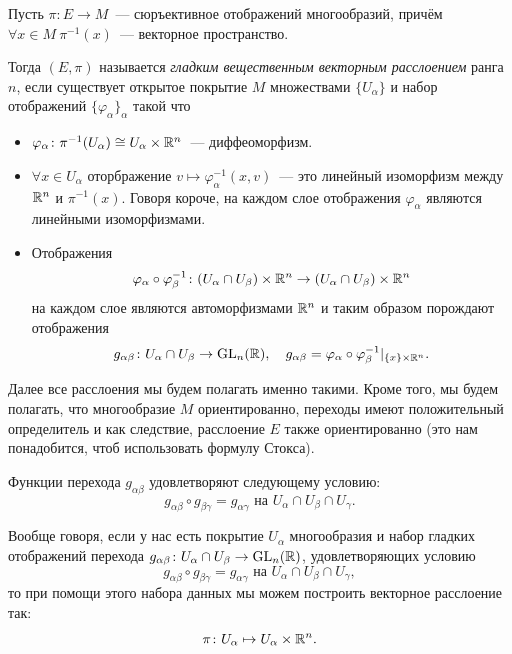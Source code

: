  	 \begin{definition} 
 	 	Пусть $\pi\colon E \to M$~--- сюръективное отображений многообразий, причём $\forall x \in M \ \pi^{-1}(x)$~--- векторное пространство. 

 	 	Тогда $(E, \pi)$ называется \emph{гладким вещественным векторным расслоением} ранга $n$, если существует открытое покрытие $M$ множествами $\{ U_{\alpha} \}$  и набор отображений $\{ \varphi_{\alpha} \}_{\alpha} $ такой что 
 	 	\begin{itemize}
 	 		\item $\varphi_{\alpha}\colon \pi^{-1}(U_{\alpha}) \cong U_{\alpha} \times \mathbb{R}^n$~--- диффеоморфизм. 
 	 		\item $\forall x \in U_{\alpha}$ оторбражение $v \mapsto \varphi_{\alpha}^{-1}(x, v)$~--- это линейный изоморфизм между $\mathbb{R}^n$ и  $\pi^{-1}(x)$. Говоря короче, на каждом слое отображения $\varphi_{\alpha}$ являются линейными изоморфизмами. 

 	 		\item Отображения 
 	 		\[
 	 			\varphi_{\alpha} \circ \varphi_{\beta}^{-1}\colon (U_{\alpha} \cap U_{\beta}) \times \mathbb{R}^n \to (U_{\alpha} \cap U_{\beta}) \times \mathbb{R}^n
 	 		\]
 	 		на каждом слое являются автоморфизмами $\mathbb{R}^n$ и таким образом порождают отображения 
 	 		\[
 	 			g_{\alpha \beta}\colon U_{\alpha} \cap U_{\beta} \to \operatorname{GL}_{n}(\mathbb{R}), \quad g_{\alpha \beta} = \varphi_{\alpha} \circ \varphi_{\beta}^{-1}\vert_{\{ x \} \times \mathbb{R}^n}.
 	 		\]
 	 	\end{itemize}

 	 	\end{definition}

 	 	Далее все расслоения мы будем полагать именно такими. Кроме того, мы будем полагать, что многообразие $M$ ориентированно, переходы имеют положительный определитель и как следствие, расслоение $E$ также ориентированно (это нам понадобится, чтоб использовать формулу Стокса). 

 	 	\begin{remark}
 	 		Функции перехода $g_{\alpha \beta}$ удовлетворяют следующему условию: 
 	 	\[
 	 		g_{\alpha \beta} \circ g_{\beta \gamma} = g_{\alpha \gamma} \text{ на } U_{\alpha} \cap U_{\beta} \cap U_{\gamma}.
 	 	\]

 	 	Вообще говоря, если у нас есть покрытие $U_{\alpha}$ многообразия и набор гладких отображений перехода $g_{\alpha \beta}\colon U_{\alpha} \cap U_{\beta} \to \operatorname{GL}_n(\mathbb{R})$, удовлетворяющих условию 
 	 	\[
 	 		g_{\alpha \beta} \circ g_{\beta \gamma} = g_{\alpha \gamma} \text{ на } U_{\alpha} \cap U_{\beta} \cap U_{\gamma},
 	 	\]
 	 	то при помощи этого набора данных мы можем построить векторное расслоение так: 
 	 	\[
 	 		\pi\colon U_{\alpha} \mapsto U_{\alpha} \times \mathbb{R}^n.
 	 	\]
 	 	\end{remark}

